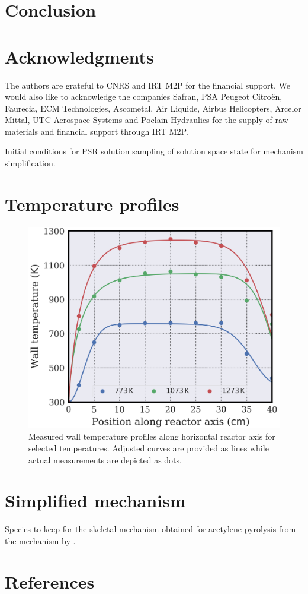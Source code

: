 \documentclass[final,3p,times,twocolumn,sort&compress]{elsarticle}
\begin{document}
\section{Conclusion}

\section*{Acknowledgments}

The authors are grateful to CNRS and IRT M2P for the financial support. We would also like to acknowledge the companies Safran, PSA Peugeot Citroën, Faurecia, ECM Technologies, Ascometal, Air Liquide, Airbus Helicopters, Arcelor Mittal, UTC Aerospace Systems and Poclain Hydraulics for the supply of raw materials and financial support through IRT M2P.

\begin{table}
	\caption{\label{tab-sampling-conditions}Initial conditions for PSR solution sampling of solution space state for mechanism simplification.}
\end{table}

\appendix
\section{Temperature profiles}
\begin{figure}
	\centering
	\includegraphics[width=\linewidth]{figures/wall_temperature_plot}
	\caption{\label{fig:temperature-profile}Measured wall temperature profiles along horizontal reactor axis for selected temperatures. Adjusted curves are provided as lines while actual measurements are depicted as dots.}
\end{figure}

\section{Simplified mechanism}

\begin{table}
	\caption{\label{tab-species-to-kep}Species to keep for the skeletal mechanism obtained for acetylene pyrolysis from the mechanism by \citet{Norinaga2009}.}
\end{table}


\section*{References}

\end{document}
